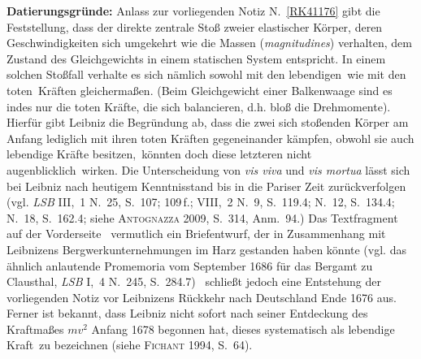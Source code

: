 \begin{ledgroup}
\footnotesize
\pstart
\noindent%
\textbf{Datierungsgründe:}
%
Anlass zur vorliegenden Notiz N.~\ref{RK41176} gibt die Feststellung, dass der direkte zentrale Stoß zweier elastischer Körper, deren Geschwindigkeiten sich umgekehrt wie die Massen (\textit{magnitudines}) verhalten, dem Zustand des Gleichgewichts in einem statischen System entspricht.
In einem solchen Stoßfall verhalte es sich nämlich sowohl mit den \glqq lebendigen\grqq\ wie mit den \glqq toten\grqq\ Kräften gleichermaßen.
(Beim Gleichgewicht einer Balkenwaage sind es indes nur die \glqq toten Kräfte\grqq, die sich balancieren, d.h. bloß die Drehmomente).
Hierfür gibt Leibniz die %
Begründung ab, dass die zwei sich stoßenden Körper \glqq am Anfang lediglich mit ihren toten Kräften gegeneinander kämpfen, obwohl sie auch lebendige Kräfte besitzen,\grqq\
könnten doch diese letzteren nicht \glqq augenblicklich\grqq\ wirken.
\pend%
%
\pstart%
Die Unterscheidung von \textit{vis viva} und \textit{vis mortua} lässt sich bei Leibniz nach heutigem Kenntnisstand bis in die Pariser Zeit zurückverfolgen (vgl. \textit{LSB} III,~1 N.~25, S.~107; 109\,f.;\cite{01374}
VIII,~2 N.~9, S.~119.4;\cite{01375}
N.~12, S.~134.4;\cite{01352}
N.~18, S.~162.4;\cite{01376}
siehe \textsc{Antognazza} %
2009, S.~314, Anm.~94.)\cite{01381}
Das Textfragment auf der Vorderseite \textendash\ vermutlich ein Briefentwurf, der in Zusammenhang mit Leibnizens Bergwerkunternehmungen im Harz\protect{} gestanden haben könnte (vgl. das ähnlich anlautende Promemoria vom September 1686 für das Bergamt zu Clausthal\protect{}, \textit{LSB} I,~4 N.~245, S.~284.7)\cite{01377} \textendash\ schließt jedoch eine Entstehung der vorliegenden Notiz vor Leibnizens Rückkehr nach Deutschland\protect{} Ende 1676 aus.
Ferner ist bekannt, dass Leibniz nicht sofort nach seiner Entdeckung des Kraftmaßes $mv^2$ Anfang 1678 begonnen hat, dieses systematisch als \glqq lebendige Kraft\grqq\ zu bezeichnen (siehe \textsc{Fichant} 1994, S.~64).\cite{01056}

\end{ledgroup}
